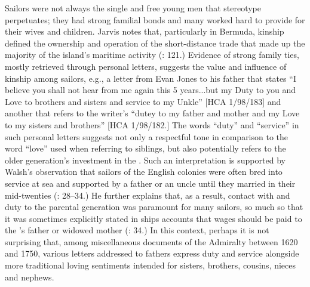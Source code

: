   Sailors were not always the single and free young men that stereotype perpetuates; they had strong familial bonds and many worked hard to provide for their wives and children. Jarvis notes that, particularly in Bermuda, kinship defined the ownership and operation of the short-distance trade that made up the majority of the island’s maritime activity (\citeyear*{Jarvis2010}: 121.) Evidence of strong family ties, mostly retrieved through personal letters, suggests the value and influence of kinship among sailors, e.g., a letter from Evan Jones to his father that states “I believe you shall not hear from me again this 5 years...but my Duty to you and Love to brothers and sisters and service to my Unkle” [HCA 1/98/183] and another that refers to the writer’s “dutey to my father and mother and my Love to my sisters and brothers” [HCA 1/98/182.] The words “duty” and “service” in such personal letters suggests not only a respectful tone in comparison to the word “love” used when referring to siblings, but also potentially refers to the older generation’s investment in the . Such an interpretation is supported by Walsh’s observation that sailors of the English colonies were often bred into service at sea and supported by a father or an uncle until they married in their mid-twenties (\citeyear*{Walsh1994}: 28--34.) He further explains that, as a result, contact with and duty to the parental generation was paramount for many sailors, so much so that it was sometimes explicitly stated in ships accounts that wages should be paid to the ’s father or widowed mother (\citealt{Walsh1994}: 34.) In this context, perhaps it is not surprising that, among miscellaneous documents of the Admiralty between 1620 and 1750, various letters addressed to fathers express duty and service alongside more traditional loving sentiments intended for sisters, brothers, cousins, nieces and nephews.  

